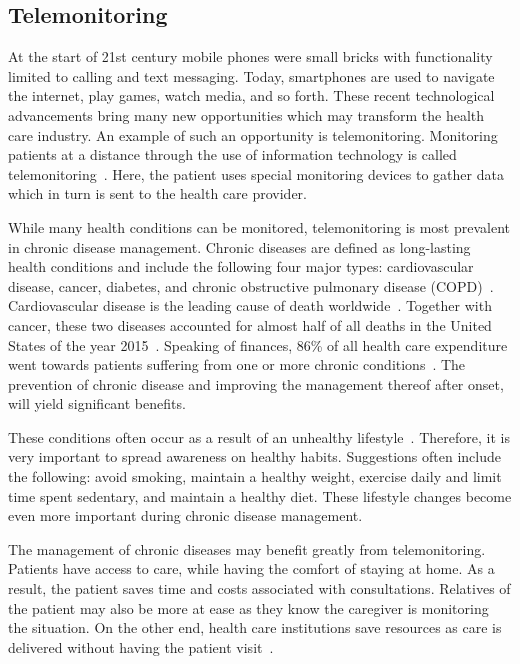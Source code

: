     \subsection{Telemonitoring}\label{telemonitoring}

    At the start of 21st century mobile phones were small bricks with functionality limited to calling and text messaging. Today, smartphones are used to navigate the internet, play games, watch media, and so forth. These recent technological advancements bring many new opportunities which may transform the health care industry. An example of such an opportunity is telemonitoring. Monitoring patients at a distance through the use of information technology is called telemonitoring~\cite{Field1996}. Here, the patient uses special monitoring devices to gather data which in turn is sent to the health care provider. 
    
    While many health conditions can be monitored, telemonitoring is most prevalent in chronic disease management. Chronic diseases are defined as long-lasting health conditions and include the following four major types: cardiovascular disease, cancer, diabetes, and chronic obstructive pulmonary disease (COPD)~\cite{WHO2014}. Cardiovascular disease is the leading cause of death worldwide~\cite{Mendis2011}. Together with cancer, these two diseases accounted for almost half of all deaths in the United States of the year 2015~\cite{NCHS2015}. Speaking of finances, 86\% of all health care expenditure went towards patients suffering from one or more chronic conditions~\cite{Gerteis2014}. The prevention of chronic disease and improving the management thereof after onset, will yield significant benefits.
    
    These conditions often occur as a result of an unhealthy lifestyle~\cite{Willett2006}. Therefore, it is very important to spread awareness on healthy habits. Suggestions often include the following: avoid smoking, maintain a healthy weight, exercise daily and limit time spent sedentary, and maintain a healthy diet. These lifestyle changes become even more important during chronic disease management.

    The management of chronic diseases may benefit greatly from telemonitoring. Patients have access to care, while having the comfort of staying at home. As a result, the patient saves time and costs associated with consultations. Relatives of the patient may also be more at ease as they know the caregiver is monitoring the situation. On the other end, health care institutions save resources as care is delivered without having the patient visit~\cite{Meystre2005}.


